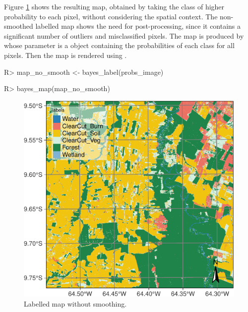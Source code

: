 \documentclass[
  shortnames]{jss}
\begin{document}
Figure \ref{fig:map1} shows the resulting map, obtained by taking the class of higher probability to each pixel, without considering the spatial context. The non-smoothed labelled map shows the need for post-processing, since it contains a significant number of outliers and misclassified pixels. The map is produced by  whose parameter is a  object containing the probabilities of each class for all pixels. Then the map is rendered using .

\begin{CodeChunk}
\begin{CodeInput}
R> map_no_smooth <- bayes_label(probs_image)
\end{CodeInput}
\end{CodeChunk}

\begin{CodeChunk}
\begin{CodeInput}
R> bayes_map(map_no_smooth)
\end{CodeInput}
\begin{figure}[h]

{\centering \includegraphics{Bayesian_smoothing_JSS_files/figure-latex/map1-1} 

}

\caption[Labelled map without smoothing]{Labelled map without smoothing.}\label{fig:map1}
\end{figure}
\end{CodeChunk}
\end{document}
